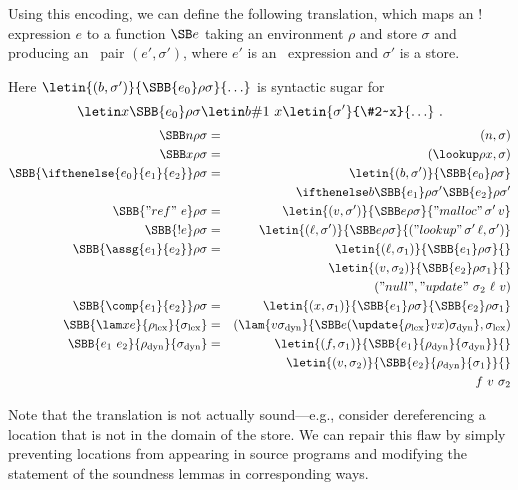 \renewcommand\p[2]{(#1,#2)}

Using this encoding, we can define the following translation, which
maps an \FL! expression $e$ to a function $\SB e$ taking an
environment $\rho$ and store $\sigma$ and producing an \FL\ pair
$\p{e'}{\sigma'}$, where $e'$ is an \FL\ expression and $\sigma'$ is a
store.

Here $\letin{\p b{\sigma'}}{\SBB{e_0}\rho\sigma}{\ldots}$ is syntactic
sugar for
\[
\letin x{\SBB{e_0}\rho\sigma}{\letin b{\#1~x}{\letin{\sigma'}{\#2~x}{\ldots}}}~.
\]
\begin{eqnarray*}
\SBB n\rho\sigma &=& \p n\sigma\\
\SBB x\rho\sigma &=& \p{\lookup\rho x}\sigma\\
\SBB{\ifthenelse{e_0}{e_1}{e_2}}\rho\sigma &=&
\letin{\p b{\sigma'}}{\SBB{e_0}\rho\sigma}\\
&& \ifthenelse b{\SBB{e_1}\rho{\sigma'}}{\SBB{e_2}\rho{\sigma'}}\\
\SBB{"ref"~e}\rho\sigma &=& \letin{\p v{\sigma'}}{\SBB e\rho\sigma}{"malloc"\,{\sigma'}\,v}\\
\SBB{!e}\rho\sigma &=& \letin{\p\ell{\sigma'}}{\SBB e\rho\sigma}{\p{"lookup"\,{\sigma'}\,\ell}{\sigma'}}\\
\SBB{\assg{e_1}{e_2}}\rho\sigma &=& \letin{\p{\ell}{\sigma_1}}{\SBB{e_1}\rho\sigma}{}\\
&& \letin{\p{v}{\sigma_2}}{\SBB{e_2}\rho{\sigma_1}}{}\\
&& \p{"null"}{"update"~{\sigma_2}~{\ell}~{v}}\\
\SBB{\comp{e_1}{e_2}}\rho\sigma &=& \letin{\p x{\sigma_1}}{\SBB{e_1}\rho\sigma}{\SBB{e_2}\rho{\sigma_1}}\\
\SBB{\lam xe}{\rho_{\mathrm{lex}}}{\sigma_{\mathrm{lex}}} &=&
\p{\lam{v\sigma_{\mathrm{dyn}}}{\SBB e{(\update{\rho_{\mathrm{lex}}}vx)}{\sigma_{\mathrm{dyn}}}}}{\sigma_{\mathrm{lex}}}\\
\SBB{e_1~e_2}{\rho_{\mathrm{dyn}}}{\sigma_{\mathrm{dyn}}} &=&
\letin{\p f{\sigma_1}}{\SBB{e_1}{\rho_{\mathrm{dyn}}}{\sigma_{\mathrm{dyn}}}}{}\\
&& \letin{\p v{\sigma_2}}{\SBB{e_2}{\rho_{\mathrm{dyn}}}{\sigma_1}}{}\\
&& f~v~\sigma_2
\end{eqnarray*}

Note that the translation is not actually sound---e.g., consider
dereferencing a location that is not in the domain of the store. We
can repair this flaw by simply preventing locations from appearing in
source programs and modifying the statement of the soundness lemmas in
corresponding ways.
